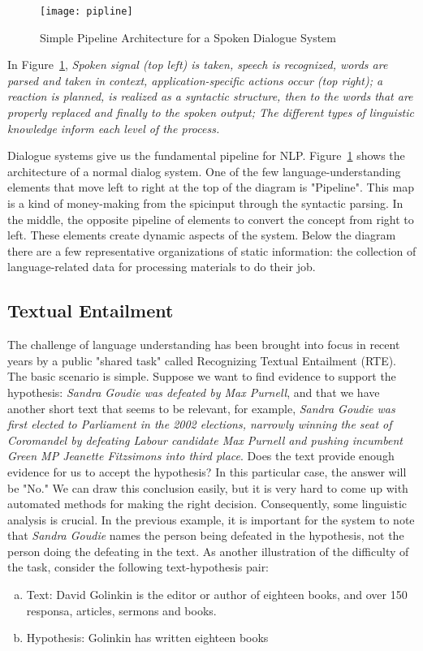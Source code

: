 \begin{figure}
    \centering
    \texttt{[image: pipline]}
    \caption{Simple Pipeline Architecture for a Spoken Dialogue System\cite{NLPbook}}
    \label{fig:1}
\end{figure}

In Figure~\ref{fig:1}, \emph{Spoken signal (top left) is taken, speech is recognized, words are parsed and taken in context, application-specific actions occur (top right); a reaction is planned, is realized as a syntactic structure, then to the words that are properly replaced and finally to the spoken output; The different types of linguistic knowledge inform each level of the process.}

Dialogue systems give us the fundamental pipeline for NLP. Figure~\ref{fig:1} 
shows the architecture of a normal dialog system. One of the few language-understanding elements that move left to right at the top of the diagram is "Pipeline". This map is a kind of money-making from the spicinput through the syntactic parsing. In the middle, the opposite pipeline of elements to convert the concept from right to left. These elements create dynamic aspects of the system. Below the diagram there are a few representative organizations of static information: the collection of language-related data for processing materials to do their job.

\subsection{Textual Entailment}
The challenge of language understanding has been brought into focus in recent years by a public "shared task" called Recognizing Textual Entailment (RTE). The basic scenario is simple. Suppose we want to find evidence to support the hypothesis: \emph{Sandra Goudie was defeated by Max Purnell}, and that we have another short text that seems to be relevant, for example, \emph{Sandra Goudie was first elected to Parliament in the 2002 elections, narrowly winning the seat of Coromandel by defeating Labour candidate Max Purnell and pushing incumbent Green MP Jeanette Fitzsimons into third place}. Does the text provide enough evidence for us to accept the hypothesis? In this particular case, the answer will be "No." We can draw this conclusion easily, but it is very hard to come up with automated methods for making the right decision.
Consequently, some linguistic analysis is crucial. In the previous example, it is important for the system to note that \emph{Sandra Goudie} names the person being defeated in the hypothesis, not the person doing the defeating in the text. As another illustration of the difficulty of the task, consider the following text-hypothesis pair:
\begin{enumerate}[a.]
    \item Text: David Golinkin is the editor or author of eighteen books, and over 150 responsa, articles, sermons and books.
    \item Hypothesis: Golinkin has written eighteen books
    
\end{enumerate}

